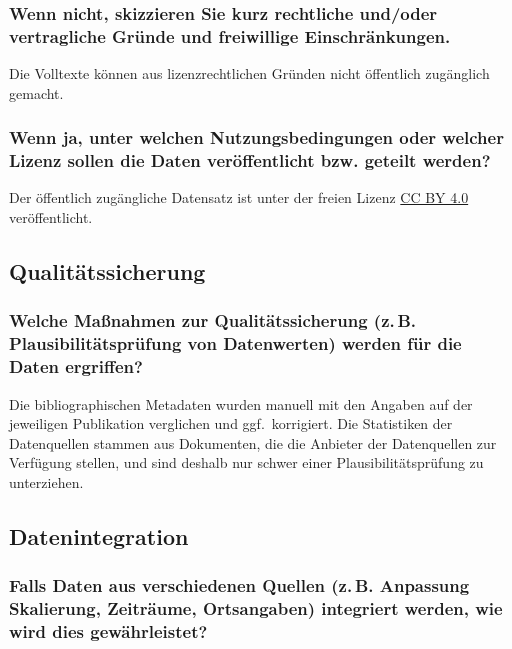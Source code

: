\documentclass[%
  11pt,
  DIV=16,
  a4paper,
  BCOR=15mm,
  twoside=on,
  bibliography=totoc,
  headings=normal,
  numbers=noendperiod,
]{scrartcl}
\begin{document}
\subsubsection{Wenn nicht, skizzieren Sie kurz rechtliche und/oder vertragliche Gründe und freiwillige Einschränkungen.}

Die Volltexte können aus lizenzrechtlichen Gründen nicht öffentlich zugänglich gemacht.

\subsubsection{Wenn ja, unter welchen Nutzungsbedingungen oder welcher Lizenz sollen die Daten veröffentlicht bzw. geteilt werden?}

Der öffentlich zugängliche Datensatz ist unter der freien Lizenz \href{https://creativecommons.org/licenses/by/4.0/}{CC BY 4.0} veröffentlicht.

\subsection{Qualitätssicherung}

\subsubsection{Welche Maßnahmen zur Qualitätssicherung (\texorpdfstring{z.\,B.}{z.B.} Plausibilitätsprüfung von Datenwerten) werden für die Daten ergriffen?}

Die bibliographischen Metadaten wurden manuell mit den Angaben auf der jeweiligen Publikation verglichen und ggf.\ korrigiert.
Die Statistiken der Datenquellen stammen aus Dokumenten, die die Anbieter der Datenquellen zur Verfügung stellen,
und sind deshalb nur schwer einer Plausibilitätsprüfung zu unterziehen.

\subsection{Datenintegration}

\subsubsection{Falls Daten aus verschiedenen Quellen (\texorpdfstring{z.\,B.}{z.B.} Anpassung Skalierung, Zeiträume, Ortsangaben) integriert werden, wie wird dies gewährleistet?}
\end{document}
